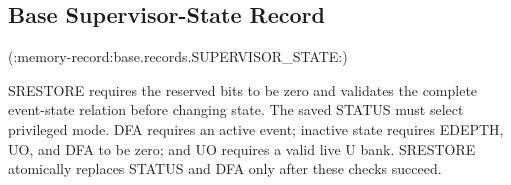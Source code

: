 \subsection{Base Supervisor-State Record}

(:memory-record:base.records.SUPERVISOR_STATE:)

SRESTORE requires the reserved bits to be zero and validates the complete event-state relation before changing state. The saved STATUS must select privileged mode. DFA requires an active event; inactive state requires EDEPTH, UO, and DFA to be zero; and UO requires a valid live U bank. SRESTORE atomically replaces STATUS and DFA only after these checks succeed.
